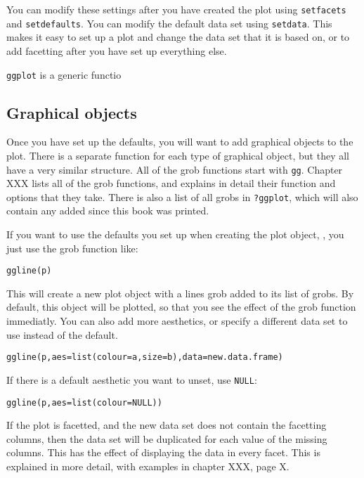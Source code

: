 You can modify these settings after you have created the plot using {\tt setfacets} and {\tt setdefaults}.  You can modify the default data set using {\tt setdata}.  This makes it easy to set up a plot and change the data set that it is based on, or to add facetting after you have set up everything else.

{\tt ggplot} is a generic functio

\subsection{Graphical objects}\label{sub:graphical_objects}

Once you have set up the defaults, you will want to add graphical objects to the plot.  There is a separate function for each type of graphical object, but they all have a very similar structure.  All of the grob functions start with {\tt gg}.  Chapter XXX lists all of the grob functions, and explains in detail their function and options that they take.  There is also a list of all grobs in {\tt ?ggplot}, which will also contain any added since this book was printed.

If you want to use the defaults you set up when creating the plot object, , you just use the grob function like:

\begin{alltt}
ggline(p)
\end{alltt}

This will create a new plot object with a lines grob added to its list of grobs.  By default, this object will be plotted, so that you see the effect of the grob function immediatly.  You can also add more aesthetics, or specify a different data set to use instead of the default.  

\begin{alltt}
ggline(p, aes=list(colour=a, size=b), data=new.data.frame)
\end{alltt}

If there is a default aesthetic you want to unset, use {\tt NULL}:

\begin{alltt}
ggline(p, aes=list(colour=NULL))
\end{alltt}

If the plot is facetted, and the new data set does not contain the facetting columns, then the data set will be duplicated for each value of the missing columns.  This has the effect of displaying the data in every facet.  This is explained in more detail, with examples in chapter XXX, page X.

